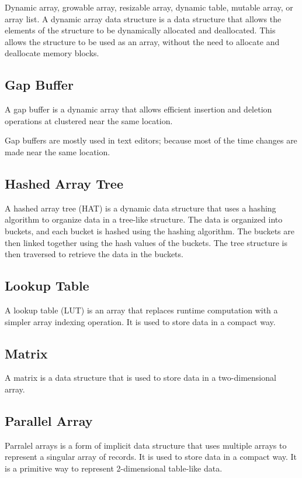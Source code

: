 \documentclass{book}
\begin{document}
Dynamic array, growable array, resizable array, dynamic table, mutable array, or array list. A dynamic array data structure is a data structure that allows the elements of the structure to be dynamically allocated and deallocated. This allows the structure to be used as an array, without the need to allocate and deallocate memory blocks.

\subsection{Gap Buffer}

A gap buffer is a dynamic array that allows efficient insertion and deletion operations at clustered near the same location.

\noindent Gap buffers are mostly used in text editors; because most of the time changes are made near the same location.

\subsection{Hashed Array Tree}

A hashed array tree (HAT) is a dynamic data structure that uses a hashing algorithm to organize data in a tree-like structure. The data is organized into buckets, and each bucket is hashed using the hashing algorithm. The buckets are then linked together using the hash values of the buckets. The tree structure is then traversed to retrieve the data in the buckets.

\subsection{Lookup Table}

A lookup table (LUT) is an array that replaces runtime computation with a simpler array indexing operation. It is used to store data in a compact way.

\subsection{Matrix}

A matrix is a data structure that is used to store data in a two-dimensional array.

\subsection{Parallel Array}

Parralel arrays is a form of implicit data structure that uses multiple arrays to represent a singular array of records. It is used to store data in a compact way. It is a primitive way to represent 2-dimensional table-like data.
\end{document}
